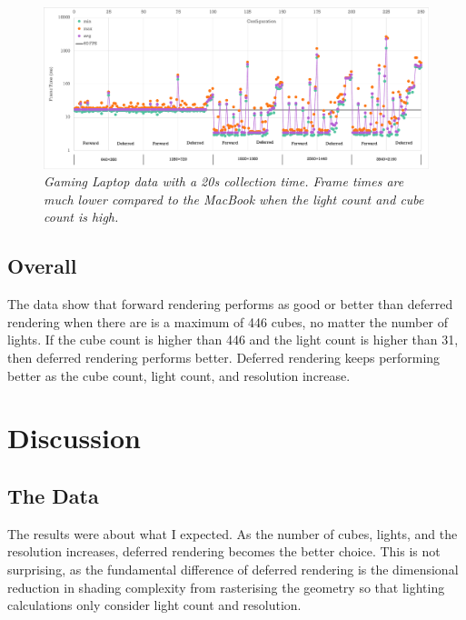 \documentclass[11pt]{article}
\begin{document}
\begin{figure}[h!]
  \begin{center}
    \includegraphics[width=1\columnwidth]{../win-20s.pdf}
  \end{center}
  \caption[Gaming Laptop Data]{
    \emph{
      Gaming Laptop data with a 20s collection time.
      Frame times are much lower compared to the MacBook when the light count and cube count is high.
    }
  }\label{fig:win-20s}
\end{figure}

\subsection{Overall}
The data show that forward rendering performs as good or better than deferred rendering when there are is a maximum of 446 cubes, no matter the number of lights.
If the cube count is higher than 446 and the light count is higher than 31, then deferred rendering performs better.
Deferred rendering keeps performing better as the cube count, light count, and resolution increase.

\section{Discussion}

\subsection{The Data}

The results were about what I expected.
As the number of cubes, lights, and the resolution increases, deferred rendering becomes the better choice.
This is not surprising, as the fundamental difference of deferred rendering is the dimensional reduction in shading complexity from rasterising the geometry so that lighting calculations only consider light count and resolution.
\end{document}

